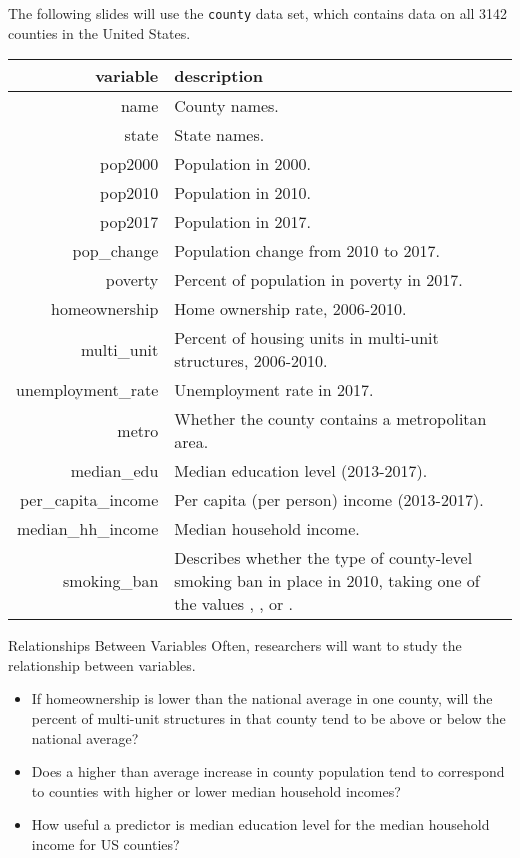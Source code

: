 \documentclass{beamer}
\begin{document}
\begin{frame}
\begin{dataset}
The following slides will use the \texttt{county} data set, which contains data on all 3142 counties in the United States.

\vspace{-5mm}
\begin{center}
\begin{tabular}{rp{9cm}}\hline
\textbf{variable} & \textbf{description} \\\hline
name	&	County names.	\\
state	&	State names.	\\
pop2000	&	Population in 2000.	\\
pop2010	&	Population in 2010.	\\
pop2017	&	Population in 2017.	\\
pop\_change	&	Population change from 2010 to 2017.	\\
poverty	&	Percent of population in poverty in 2017.	\\
homeownership	&	Home ownership rate, 2006-2010.	\\
multi\_unit	&	Percent of housing units in multi-unit structures, 2006-2010.	\\
unemployment\_rate	&	Unemployment rate in 2017.	\\
metro	&	Whether the county contains a metropolitan area.	\\
median\_edu	&	Median education level (2013-2017).	\\
per\_capita\_income	&	Per capita (per person) income (2013-2017).	\\
median\_hh\_income	&	Median household income.	\\
smoking\_ban	&	Describes whether the type of county-level smoking ban in place in 2010, taking one of the values \textquote{none}, \textquote{partial}, or \textquote{comprehensive}.	\\
\end{tabular}
\end{center}
\end{dataset}
\end{frame}

\begin{frame}
\begin{block}{Relationships Between Variables}
Often, researchers will want to study the relationship between variables.\pause

\begin{itemize}
\item If homeownership is lower than the national average in one county, will the percent of multi-unit structures in that county tend to be above or below the national average?\pause
\item Does a higher than average increase in county population tend to correspond to counties with higher or lower median household incomes?\pause
\item How useful a predictor is median education level for the median household income for US counties?
\end{itemize}
\end{block}
\end{frame}
\end{document}
